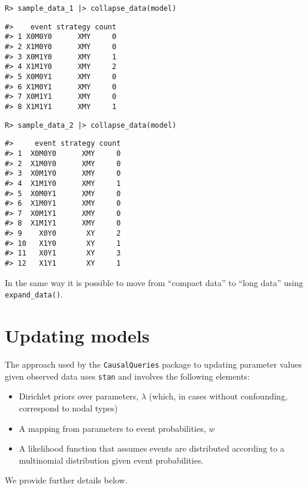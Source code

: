 \documentclass[
  11pt,
  article]{jss}
\providecommand{\tightlist}{%
  \setlength{\itemsep}{0pt}\setlength{\parskip}{0pt}}\usepackage{longtable,booktabs,array}
\begin{document}
\begin{verbatim}
R> sample_data_1 |> collapse_data(model)
\end{verbatim}

\begin{verbatim}
#>    event strategy count
#> 1 X0M0Y0      XMY     0
#> 2 X1M0Y0      XMY     0
#> 3 X0M1Y0      XMY     1
#> 4 X1M1Y0      XMY     2
#> 5 X0M0Y1      XMY     0
#> 6 X1M0Y1      XMY     0
#> 7 X0M1Y1      XMY     0
#> 8 X1M1Y1      XMY     1
\end{verbatim}

\begin{verbatim}
R> sample_data_2 |> collapse_data(model)
\end{verbatim}

\begin{verbatim}
#>     event strategy count
#> 1  X0M0Y0      XMY     0
#> 2  X1M0Y0      XMY     0
#> 3  X0M1Y0      XMY     0
#> 4  X1M1Y0      XMY     1
#> 5  X0M0Y1      XMY     0
#> 6  X1M0Y1      XMY     0
#> 7  X0M1Y1      XMY     0
#> 8  X1M1Y1      XMY     0
#> 9    X0Y0       XY     2
#> 10   X1Y0       XY     1
#> 11   X0Y1       XY     3
#> 12   X1Y1       XY     1
\end{verbatim}

In the same way it is possible to move from ``compact data'' to ``long
data'' using \texttt{expand\_data()}.

\hypertarget{updating-models}{%
\section{Updating models}\label{updating-models}}

The approach used by the \texttt{CausalQueries} package to updating
parameter values given observed data uses \texttt{stan} and involves the
following elements:

\begin{itemize}
\tightlist
\item
  Dirichlet priors over parameters, \(\lambda\) (which, in cases without
  confounding, correspond to nodal types)
\item
  A mapping from parameters to event probabilities, \(w\)
\item
  A likelihood function that assumes events are distributed according to
  a multinomial distribution given event probabilities.
\end{itemize}

We provide further details below.
\end{document}
